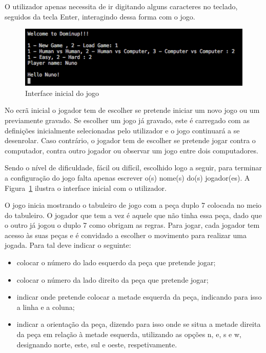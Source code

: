 \documentclass[a4paper]{article}
\begin{document}
O utilizador apenas necessita de ir digitando alguns caracteres no teclado, seguidos da tecla Enter, interagindo dessa forma com o jogo.

\begin{figure}[htbp]
\begin{center}
\includegraphics[scale=0.6]{input_ini.jpg}
\caption{Interface inicial do jogo}
\label{input_ini}
\end{center}
\end{figure}

No ecrã inicial o jogador tem de escolher se pretende iniciar um novo jogo ou um previamente gravado. Se escolher um jogo já gravado, este é carregado com as definições inicialmente selecionadas pelo utilizador e o jogo continuará a se desenrolar. Caso contrário, o jogador tem de escolher se pretende jogar contra o computador, contra outro jogador ou observar um jogo entre dois computadores. 

Sendo o nível de dificuldade, fácil ou difícil, escolhido logo a seguir, para terminar a configuração do jogo falta apenas escrever o(s) nome(s) do(s) jogador(es). A Figura~\ref{input_ini} ilustra o interface inicial com o utilizador.

O jogo inicia mostrando o tabuleiro de jogo com a peça duplo 7 colocada no meio do tabuleiro. O jogador que tem a vez é aquele que não tinha essa peça, dado que o outro já jogou o duplo 7 como obrigam as regras. Para jogar, cada jogador tem acesso às suas peças e é convidado a escolher o movimento para realizar uma jogada. Para tal deve indicar o seguinte:

\begin{itemize}
\item colocar o número do lado esquerdo da peça que pretende jogar;
\item colocar o número da lado direito da peça que pretende jogar;
\item indicar onde pretende colocar a metade esquerda da peça, indicando para isso a linha e a coluna;
\item indicar a orientação da peça, dizendo para isso onde se situa a metade direita da peça em relação à metade esquerda, utilizando as opções n, e, s e w, designando norte, este, sul e oeste, respetivamente.
\end{itemize}
\end{document}
